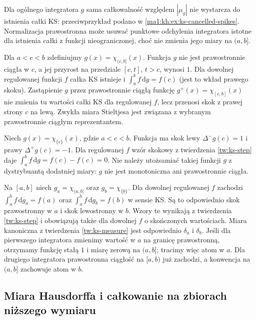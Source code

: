 \begin{uwaga}
Dla ogólnego integratora $g$ sama całkowalność
względem $|\mu_g|$ nie wystarcza do istnienia
całki KS: przeciwprzykład podano w
\ref{ma1:kh:ex:ks-cancelled-spikes}. Normalizacja
prawostronna może usuwać punktowe odchylenia
integratora istotne dla istnienia całki z funkcji
nieograniczonej, choć nie zmienia jego miary
na $(a,b]$.
\end{uwaga}

\begin{przyklad}
Dla $a<c<b$ zdefiniujmy $g(x)=\chi_{(c,b]}(x)$. Funkcja $g$ nie jest prawostronnie ciągła w $c$, a jej przyrost na przedziale $[c,t]$, $t>c$, wynosi $1$. Dla dowolnej regulowanej funkcji $f$ całka KS istnieje i $\int_a^b f\,\mathrm dg=f(c)$ (jest to wkład prawego skoku). Zastąpienie $g$ przez prawostronnie ciągłą funkcję $g^+(x)=\chi_{[c,b]}(x)$ nie zmienia tu wartości całki KS dla regulowanej $f$, lecz przenosi skok z prawej strony $c$ na lewą. Zwykła miara Stieltjesa jest związana z wybranym prawostronnie ciągłym reprezentantem.
\end{przyklad}
\begin{przyklad}
Niech $g(x)=\chi_{\{c\}}(x)$, gdzie $a<c<b$. Funkcja ma skok lewy $\Delta^-g(c)=1$ i prawy $\Delta^+g(c)=-1$. Dla regulowanej $f$ wzór skokowy z twierdzenia \ref{tw:ks-step} daje $\int_a^b f\,\mathrm dg=f(c)-f(c)=0$. Nie należy utożsamiać takiej funkcji $g$ z dystrybuantą dodatniej miary: $g$ nie jest monotoniczna ani prawostronnie ciągła.
\end{przyklad}
\begin{przyklad}
Na $[a,b]$ niech $g_a=\chi_{(a,b]}$ oraz $g_b=\chi_{\{b\}}$. Dla dowolnej regulowanej $f$ zachodzi
$\int_a^b f\,\mathrm dg_a=f(a)$ oraz $\int_a^b f\,\mathrm dg_b=f(b)$ w sensie KS. Są to odpowiednio skok prawostronny w $a$ i skok lewostronny w $b$. Wzory te wynikają z twierdzenia \ref{tw:ks-step} i obowiązują także dla dowolnej $f$ o skończonych wartościach. Miara kanoniczna z twierdzenia \ref{tw:ks-measure} jest odpowiednio $\delta_a$ i $\delta_b$. Jeśli dla pierwszego integratora zmienimy wartość w $a$ na granicę prawostronną, otrzymamy funkcję stałą $1$ i miarę zerową na $(a,b]$; tracimy więc atom w $a$. Dla drugiego integratora prawostronna ciągłość na $[a,b)$ już zachodzi, a konwencja na $(a,b]$ zachowuje atom w $b$.
\end{przyklad}

\subsection{Miara Hausdorffa i całkowanie na zbiorach niższego wymiaru}

